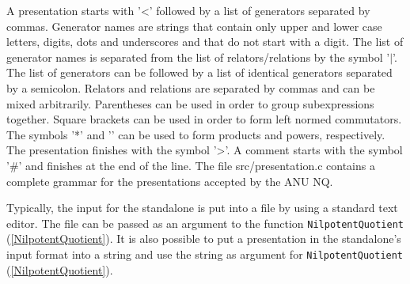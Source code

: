 \documentclass[a4paper,11pt]{report}
\begin{document}
{{\begin{verbatim}
\end{verbatim}
 A presentation starts with '{\textless}' followed by a list of generators
separated by commas. Generator names are strings that contain only upper and
lower case letters, digits, dots and underscores and that do not start with a
digit. The list of generator names is separated from the list of
relators/relations by the symbol '$\mid$'. The list of generators can be followed by a list of identical generators
separated by a semicolon. Relators and relations are separated by commas and
can be mixed arbitrarily. Parentheses can be used in order to group
subexpressions together. Square brackets can be used in order to form left
normed commutators. The symbols '*' and '\texttt{}' can be used to
form products and powers, respectively. The presentation finishes with the
symbol '{\textgreater}'. A comment starts with the symbol '\#' and finishes at
the end of the line. The file src/presentation.c contains a complete grammar
for the presentations accepted by the ANU NQ. 

Typically, the input for the standalone is put into a file by using a standard
text editor. The file can be passed as an argument to the function \texttt{NilpotentQuotient} (\ref{NilpotentQuotient}). It is also possible to put a presentation in the standalone's input format
into a string and use the string as argument for \texttt{NilpotentQuotient} (\ref{NilpotentQuotient}). }

 }

 
\end{document}
